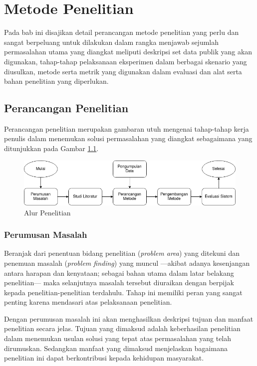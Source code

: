 \chapter{Metode Penelitian}
Pada bab ini disajikan detail perancangan metode penelitian yang perlu dan sangat berpeluang untuk dilakukan dalam rangka menjawab sejumlah permasalahan utama yang diangkat meliputi deskripsi set data publik yang akan digunakan, tahap-tahap pelaksanaan eksperimen dalam berbagai skenario yang diusulkan, metode serta metrik yang digunakan dalam evaluasi dan alat serta bahan penelitian yang diperlukan.

\section{Perancangan Penelitian}
Perancangan penelitian merupakan gambaran utuh mengenai tahap-tahap kerja penulis dalam menemukan solusi permasalahan yang diangkat sebagaimana yang ditunjukkan pada Gambar \ref{fig:desaineksperimen}.
\begin{figure}
    \centering
    \includegraphics[width=14cm]{gambar/alur_penelitian.png}
    \caption{Alur Penelitian}
    \label{fig:desaineksperimen}
\end{figure}

\subsection{Perumusan Masalah}
Beranjak dari penentuan bidang penelitian (\textit{problem area}) yang ditekuni dan penemuan masalah (\textit{problem finding}) yang muncul ---akibat adanya kesenjangan antara harapan dan kenyataan; sebagai bahan utama dalam latar belakang penelitian--- maka selanjutnya masalah tersebut diuraikan dengan berpijak kepada penelitian-penelitian terdahulu. Tahap ini memiliki peran yang sangat penting karena mendasari atas pelaksanaan penelitian.

Dengan perumusan masalah ini akan menghasilkan deskripsi tujuan dan manfaat penelitian secara jelas. Tujuan yang dimaksud adalah keberhasilan penelitian dalam menemukan usulan solusi yang tepat atas permasalahan yang  telah dirumuskan. Sedangkan manfaat yang dimaksud menjelaskan bagaimana penelitian ini dapat berkontribusi kepada kehidupan masyarakat.

